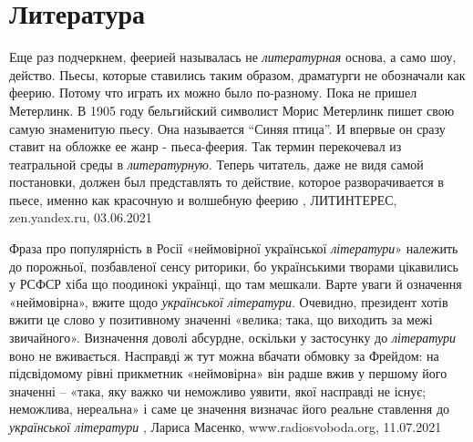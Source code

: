  
 
 
 
 
\chapter{Литература}
\label{sec:slova.literatura}

Еще раз подчеркнем, феерией называлась не \emph{литературная} основа, а само шоу,
действо. Пьесы, которые ставились таким образом, драматурги не обозначали как
феерию. Потому что играть их можно было по-разному.  Пока не пришел Метерлинк.
В 1905 году бельгийский символист Морис Метерлинк пишет свою самую знаменитую
пьесу. Она называется \enquote{Синяя птица}. И впервые он сразу ставит на обложке ее
жанр - пьеса-феерия.  Так термин перекочевал из театральной среды в
\emph{литературную}. Теперь читатель, даже не видя самой постановки, должен был
представлять то действие, которое разворачивается в пьесе, именно как красочную
и волшебную феерию
, 
ЛИТИНТЕРЕС, zen.yandex.ru, 03.06.2021

Фраза про популярність в Росії «неймовірної української \emph{літератури}» належить до
порожньої, позбавленої сенсу риторики, бо українськими творами цікавились у
РСФСР хіба що поодинокі українці, що там мешкали.
Варте уваги й означення «неймовірна», вжите щодо \emph{української літератури}.
Очевидно, президент хотів вжити це слово у позитивному значенні «велика; така,
що виходить за межі звичайного». Визначення доволі абсурдне, оскільки у
застосунку до \emph{літератури} воно не вживається. Насправді ж тут можна вбачати
обмовку за Фрейдом: на підсвідомому рівні прикметник «неймовірна» він радше
вжив у першому його значенні – «така, яку важко чи неможливо уявити, якої
насправді не існує; неможлива, нереальна» і саме це значення визначає його
реальне ставлення до \emph{української літератури}
, 
Лариса Масенко, www.radiosvoboda.org, 11.07.2021
